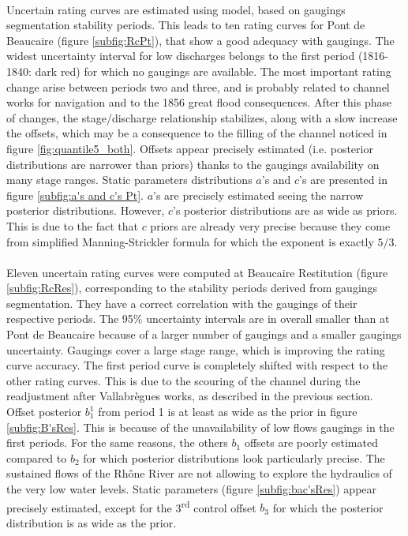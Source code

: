 \documentclass[11pt]{article}
\begin{document}
    \paragraph{}
    Uncertain rating curves are estimated using \citet{mansanarez_shift_2019} model, based on gaugings segmentation stability periods. This leads to ten rating curves for Pont de Beaucaire (figure \ref{subfig:RcPt}), that show a good adequacy with gaugings. The widest uncertainty interval for low discharges belongs to the first period (1816-1840: dark red) for which no gaugings are available. The most important rating change arise between periods two and three, and is probably related to channel works for navigation and to the 1856 great flood consequences. After this phase of changes, the stage/discharge relationship stabilizes, along with a slow increase the offsets, which may be a consequence to the filling of the channel noticed in figure \ref{fig:quantile5_both}. Offsets appear precisely estimated (i.e. posterior distributions are narrower than priors) thanks to the gaugings availability on many stage ranges. Static parameters distributions $a$'s and $c$'s are presented in figure \ref{subfig:a's and c's Pt}. $a$'s are precisely estimated seeing the narrow posterior distributions. However, $c$'s posterior distributions are as wide as priors. This is due to the fact that $c$ priors are already very precise because they come from simplified Manning-Strickler formula for which the exponent is exactly $5/3$.
    
    \paragraph{}
    Eleven uncertain rating curves were computed at Beaucaire Restitution (figure \ref{subfig:RcRes}), corresponding to the stability periods derived from gaugings segmentation. They have a correct correlation with the gaugings of their respective periods. The 95\% uncertainty intervals are in overall smaller than at Pont de Beaucaire because of a larger number of gaugings and a smaller gaugings uncertainty. Gaugings cover a large stage range, which is improving the rating curve accuracy. The first period curve is completely shifted with respect to the other rating curves. This is due to the scouring of the channel during the readjustment after Vallabrègues works, as described in the previous section. Offset posterior $b_1^1$ from period 1 is at least as wide as the prior in figure \ref{subfig:B'sRes}. This is because of the unavailability of low flows gaugings in the first periods. For the same reasons, the others $b_1$ offsets are poorly estimated compared to $b_2$ for which posterior distributions look particularly precise. The sustained flows of the Rhône River are not allowing to explore the hydraulics of the very low water levels. Static parameters (figure \ref{subfig:bac'sRes}) appear precisely estimated, except for the 3\textsuperscript{rd} control offset $b_3$ for which the posterior distribution is as wide as the prior. 
    
\end{document}
